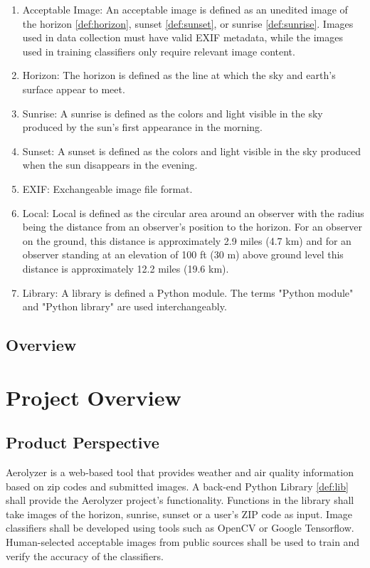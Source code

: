 \documentclass[journal,10pt,draftclsnofoot,onecolumn]{IEEEtran}
\begin{document}
\begin{singlespace}
\begin{enumerate}
			\item \label{def:accImg} Acceptable Image:
			An acceptable image is defined as an unedited image of the horizon \ref{def:horizon}, sunset \ref{def:sunset}, or sunrise \ref{def:sunrise}.
			Images used in data collection must have valid EXIF metadata, while the images used in training classifiers only require relevant image content.

			\item \label{def:horizon} Horizon:
			The horizon is defined as the line at which the sky and earth's surface appear to meet.

			\item \label{def:sunrise} Sunrise:
			A sunrise is defined as the colors and light visible in the sky produced by the sun's first appearance in the morning.

			\item \label{def:sunset} Sunset:
			A sunset is defined as the colors and light visible in the sky produced when the sun disappears in the evening.

			\item \label{def:exif} EXIF:
			Exchangeable image file format.

			\item \label{def:local} Local:
			Local is defined as the circular area around an observer with the radius being the distance from an observer's position to the horizon.
			For an observer on the ground, this distance is approximately 2.9 miles (4.7 km) and for an observer standing at an elevation of 100 ft (30 m) above ground level this distance is approximately 12.2 miles (19.6 km).

			\item \label{def:lib} Library:
			A library is defined a Python module. The terms "Python module" and "Python library" are used interchangeably.
		\end{enumerate}

	\nocite{*}
	
	

	\subsection{Overview}

\clearpage

\section{Project Overview}
	\subsection{Product Perspective}
		Aerolyzer is a web-based tool that provides weather and air quality information based on zip codes and submitted images.
		A back-end Python Library \ref{def:lib} shall provide the Aerolyzer project's functionality.
		Functions in the library shall take images of the horizon, sunrise, sunset or a user's ZIP code as input.
		Image classifiers shall be developed using tools such as OpenCV or Google Tensorflow.
		Human-selected acceptable images from public sources shall be used to train and verify the accuracy of the classifiers.


\end{singlespace}
\end{document}
